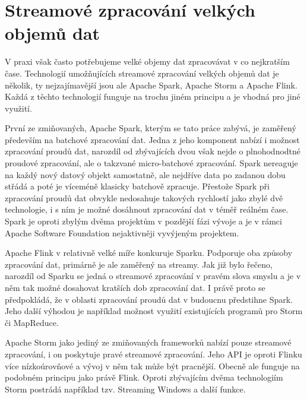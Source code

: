 \documentclass[thesis=B,czech]{FITthesis}[2012/06/26]
\begin{document}
\section{Streamové zpracování velkých objemů dat}
	V praxi však často potřebujeme velké objemy dat zpracovávat v co nejkratším čase. Technologií umožňujících streamové zpracování velkých objemů dat je několik, ty nejzajímavější jsou ale Apache Spark, Apache Storm a Apache Flink. Každá z těchto technologií funguje na trochu jiném principu a je vhodná pro jiné využití. 
	
	První ze zmiňovaných, Apache Spark, kterým se tato práce zabývá, je zaměřený především na batchové zpracování dat. Jedna z jeho komponent nabízí i možnost zpracování proudů dat, narozdíl od zbývajících dvou však nejde o plnohodnodtné proudové zpracování, ale o takzvané micro-batchové zpracování. Spark nereaguje na každý nový datový objekt samostatně, ale nejdříve data po zadanou dobu střádá a poté je víceméně klasicky batchově zpracuje\cite{??}. Přestože Spark při zpracování proudů dat obvykle nedosahuje takových rychlostí jako zbylé dvě technologie, i s ním je možné dosáhnout zpracování dat v téměř reálném čase\cite{https://yahooeng.tumblr.com/post/135321837876/benchmarking-streaming-computation-engines-at}. Spark je oproti zbylým dvěma projektům v pozdější fázi vývoje a je v rámci Apache Software Foundation nejaktivněji vyvýjeným projektem\cite{??}. 
	
	Apache Flink v relativně velké míře konkuruje Sparku. Podporuje oba způsoby zpracování dat, primárně je ale zaměřený na streamy. Jak již bylo řečeno, narozdíl od Sparku se jedná o streamové zpracování v pravém slova smyslu a je v něm tak možné dosahovat kratších dob zpracování dat. I právě proto se předpokládá, že v oblasti zpracování proudů dat v budoucnu předstihne Spark\cite{http://www.kdnuggets.com/2015/11/fast-big-data-apache-flink-spark-streaming.html}. Jeho další výhodou je například možnost využití existujících programů pro Storm či MapReduce. 
	
	Apache Storm jako jediný ze zmiňovaných frameworků nabízí pouze streamové zpracování, i on poskytuje pravé streamové zpracování. Jeho API je oproti Flinku více nízkoúrovňové a vývoj v něm tak může být pracnější. Obecně ale funguje na podobném principu jako právě Flink. Oproti zbývajícím dvěma technologiím Storm postrádá například tzv. Streaming Windows a další funkce\cite{http://stackoverflow.com/questions/30699119/what-is-are-the-main-differences-between-flink-and-storm}.
	
\end{document}
